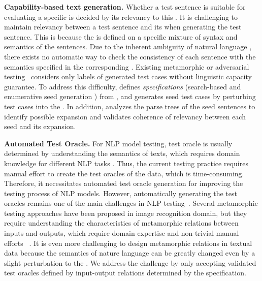 \noindent \textbf{Capability-based text generation.} Whether a test sentence is suitable for evaluating a specific \lc is decided by its relevancy to this
\lc. It is challenging to maintain relevancy between a test sentence and its \lc when generating the test sentence.
This is because the \lc is defined on a specific 
mixture of syntax and semantics of the sentences. Due to the inherent ambiguity of natural language \sents, there exists no automatic way to check the consistency of each sentence with the semantics specified in the corresponding \lc. Existing metamorphic or adversarial testing~\cite{morris2020textattack,zang2020sememepso,alzantot2018genadvexp,linyang2020bertattack,udeshi2019ogma} considers only labels of generated test cases without linguistic capacity guarantee. To address this difficulty, \tool defines \emph{specifications} (search-based and enumerative seed generation \phs) from \lcs,
and generates seed test cases by perturbing test cases into the \phs. In addition, \tool analyzes the parse trees of the seed sentences to identify possible expansion and validates coherence of \lc relevancy between each seed and its expansion.

\noindent \textbf{Automated Test Oracle.}   For NLP model testing, test oracle is usually determined by understanding the semantics of texts, which requires domain knowledge for different NLP tasks \cite{barr2014oracle, nmt_se1, nmt_se2, nmt_se3}.
Thus, the current testing practice requires manual effort to create the test oracles of the \ho data, which is time-consuming. Therefore, it necessitates automated test oracle generation for improving the testing process of NLP models. 
However, automatically generating the  test oracles remains one of the main challenges in NLP testing~\cite{huang2022aeon, nmt_se1, nmt_se2, nmt_se3}. 
Several metamorphic testing approaches have been proposed in image recognition domain, but they require understanding the characteristics of metamorphic relations between inputs and outputs, which require domain expertise and non-trivial manual efforts ~\cite{tian2018deeptest, ma2018deepgauge, pei2017deepxplore, xie2019deephunter, zhang2018deeproad, chen2022deepperform}. 
It is even more challenging to design metamorphic relations in textual data because the semantics of nature language \sents can be greatly changed even by a slight perturbation to the \sents. We address the challenge by only accepting validated test oracles defined by input-output relations determined by the \lc specification. 


